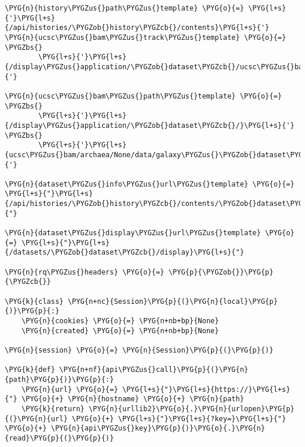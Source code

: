 \begin{Verbatim}[commandchars=\\\{\}]
\PYG{n}{history\PYGZus{}path\PYGZus{}template} \PYG{o}{=} \PYG{l+s}{'}\PYG{l+s}{/api/histories/\PYGZob{}history\PYGZcb{}/contents}\PYG{l+s}{'}
\PYG{n}{ucsc\PYGZus{}bam\PYGZus{}track\PYGZus{}template} \PYG{o}{=} \PYGZbs{}
        \PYG{l+s}{'}\PYG{l+s}{/display\PYGZus{}application/\PYGZob{}dataset\PYGZcb{}/ucsc\PYGZus{}bam/archaea/None/param/track}\PYG{l+s}{'}

\PYG{n}{ucsc\PYGZus{}bam\PYGZus{}path\PYGZus{}template} \PYG{o}{=} \PYGZbs{}
        \PYG{l+s}{'}\PYG{l+s}{/display\PYGZus{}application/\PYGZob{}dataset\PYGZcb{}/}\PYG{l+s}{'} \PYGZbs{}
        \PYG{l+s}{'}\PYG{l+s}{ucsc\PYGZus{}bam/archaea/None/data/galaxy\PYGZus{}\PYGZob{}dataset\PYGZcb{}.bam}\PYG{l+s}{'}

\PYG{n}{dataset\PYGZus{}info\PYGZus{}url\PYGZus{}template} \PYG{o}{=} \PYG{l+s}{"}\PYG{l+s}{/api/histories/\PYGZob{}history\PYGZcb{}/contents/\PYGZob{}dataset\PYGZcb{}}\PYG{l+s}{"}

\PYG{n}{dataset\PYGZus{}display\PYGZus{}url\PYGZus{}template} \PYG{o}{=} \PYG{l+s}{"}\PYG{l+s}{/datasets/\PYGZob{}dataset\PYGZcb{}/display}\PYG{l+s}{"}

\PYG{n}{rq\PYGZus{}headers} \PYG{o}{=} \PYG{p}{\PYGZob{}}\PYG{p}{\PYGZcb{}}

\PYG{k}{class} \PYG{n+nc}{Session}\PYG{p}{(}\PYG{n}{local}\PYG{p}{)}\PYG{p}{:}
    \PYG{n}{cookies} \PYG{o}{=} \PYG{n+nb+bp}{None}
    \PYG{n}{created} \PYG{o}{=} \PYG{n+nb+bp}{None}

\PYG{n}{session} \PYG{o}{=} \PYG{n}{Session}\PYG{p}{(}\PYG{p}{)}

\PYG{k}{def} \PYG{n+nf}{api\PYGZus{}call}\PYG{p}{(}\PYG{n}{path}\PYG{p}{)}\PYG{p}{:}
    \PYG{n}{url} \PYG{o}{=} \PYG{l+s}{"}\PYG{l+s}{https://}\PYG{l+s}{"} \PYG{o}{+} \PYG{n}{hostname} \PYG{o}{+} \PYG{n}{path}
    \PYG{k}{return} \PYG{n}{urllib2}\PYG{o}{.}\PYG{n}{urlopen}\PYG{p}{(}\PYG{n}{url} \PYG{o}{+} \PYG{l+s}{"}\PYG{l+s}{?key=}\PYG{l+s}{"} \PYG{o}{+} \PYG{n}{api\PYGZus{}key}\PYG{p}{)}\PYG{o}{.}\PYG{n}{read}\PYG{p}{(}\PYG{p}{)}


\end{Verbatim}
